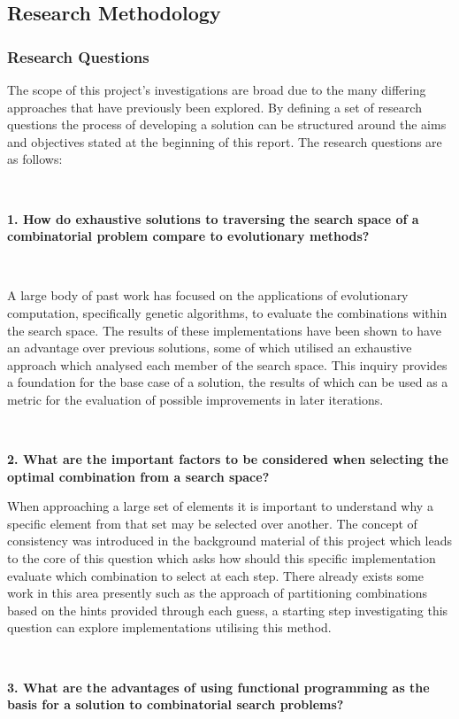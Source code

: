\documentclass[12pt]{article}  %
\theoremstyle{definition}
\theoremstyle{remark}
\begin{document}
\subsection {Research Methodology}

\subsubsection {Research Questions}

The scope of this project's investigations are broad due to the many differing approaches that have previously been explored. By defining a set of research questions the process of developing a solution can be structured around the aims and objectives stated at the beginning of this report. The research questions are as follows:

\

\textbf{1. How do exhaustive solutions to traversing the search space of a combinatorial problem compare to evolutionary methods?}

\

A large body of past work has focused on the applications of evolutionary computation, specifically genetic algorithms, to evaluate the combinations within the search space. The results of these implementations have been shown to have an advantage over previous solutions, some of which utilised an exhaustive approach which analysed each member of the search space. This inquiry provides a foundation for the base case of a solution, the results of which can be used as a metric for the evaluation of possible improvements in later iterations.

\

\textbf{2. What are the important factors to be considered when selecting the optimal combination from a search space?}

When approaching a large set of elements it is important to understand why a specific element from that set may be selected over another. The concept of consistency was introduced in the background material of this project which leads to the core of this question which asks how should this specific implementation evaluate which combination to select at each step. There already exists some work in this area presently such as the approach of partitioning combinations based on the hints provided through each guess, a starting step investigating this question can explore implementations utilising this method.

\

\textbf{3. What are the advantages of using functional programming as the basis for a solution to combinatorial search problems?}
\end{document}
